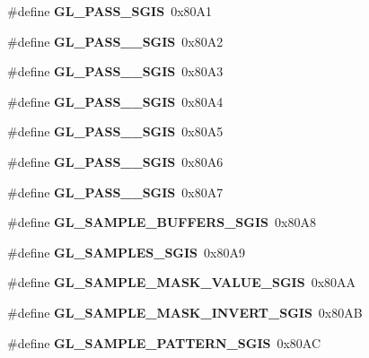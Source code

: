 \begin{DoxyCompactItemize}
\item 
\#define {\bfseries G\+L\+\_\+P\+A\+S\+S\+\_\+\+S\+G\+I\+S}~0x80\+A1\label{_s_d_l__opengl_8h_a49502a48b1761c54e7712b2a7624e9b2}

\item 
\#define {\bfseries G\+L\+\_\+P\+A\+S\+S\+\_\+\_\+\+S\+G\+I\+S}~0x80\+A2\label{_s_d_l__opengl_8h_a6f88f24f5aabf5739c9ae604c1729d68}

\item 
\#define {\bfseries G\+L\+\_\+P\+A\+S\+S\+\_\+\_\+\+S\+G\+I\+S}~0x80\+A3\label{_s_d_l__opengl_8h_ab7e995d0e4115249466e4661750ab7d4}

\item 
\#define {\bfseries G\+L\+\_\+P\+A\+S\+S\+\_\+\_\+\+S\+G\+I\+S}~0x80\+A4\label{_s_d_l__opengl_8h_ac494352ec0e96ac67fdfe9d8189ff96b}

\item 
\#define {\bfseries G\+L\+\_\+P\+A\+S\+S\+\_\+\_\+\+S\+G\+I\+S}~0x80\+A5\label{_s_d_l__opengl_8h_aebac9095c5a86980ebc8665fda7d68d2}

\item 
\#define {\bfseries G\+L\+\_\+P\+A\+S\+S\+\_\+\_\+\+S\+G\+I\+S}~0x80\+A6\label{_s_d_l__opengl_8h_a66623e50c957f19c4754b68090f037ba}

\item 
\#define {\bfseries G\+L\+\_\+P\+A\+S\+S\+\_\+\_\+\+S\+G\+I\+S}~0x80\+A7\label{_s_d_l__opengl_8h_a44803f3eb30e5141f36a6a303253e6b9}

\item 
\#define {\bfseries G\+L\+\_\+\+S\+A\+M\+P\+L\+E\+\_\+\+B\+U\+F\+F\+E\+R\+S\+\_\+\+S\+G\+I\+S}~0x80\+A8\label{_s_d_l__opengl_8h_a9bb9283642e0968f8fc36648efb88063}

\item 
\#define {\bfseries G\+L\+\_\+\+S\+A\+M\+P\+L\+E\+S\+\_\+\+S\+G\+I\+S}~0x80\+A9\label{_s_d_l__opengl_8h_ae8288aab3962697faacae653234bdcbb}

\item 
\#define {\bfseries G\+L\+\_\+\+S\+A\+M\+P\+L\+E\+\_\+\+M\+A\+S\+K\+\_\+\+V\+A\+L\+U\+E\+\_\+\+S\+G\+I\+S}~0x80\+A\+A\label{_s_d_l__opengl_8h_a7c6f46865103580482285addda4bdc46}

\item 
\#define {\bfseries G\+L\+\_\+\+S\+A\+M\+P\+L\+E\+\_\+\+M\+A\+S\+K\+\_\+\+I\+N\+V\+E\+R\+T\+\_\+\+S\+G\+I\+S}~0x80\+A\+B\label{_s_d_l__opengl_8h_a9327cbd41490fd9bc8e92f5d02450920}

\item 
\#define {\bfseries G\+L\+\_\+\+S\+A\+M\+P\+L\+E\+\_\+\+P\+A\+T\+T\+E\+R\+N\+\_\+\+S\+G\+I\+S}~0x80\+A\+C\label{_s_d_l__opengl_8h_a0e0ca405513fabdbf243c1b19d169116}


\end{DoxyCompactItemize}

